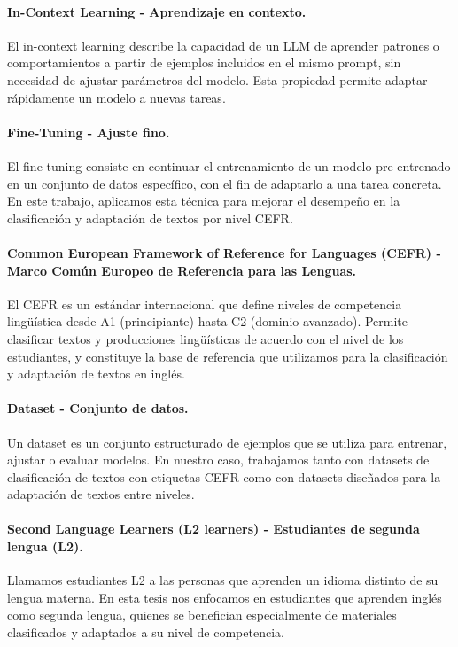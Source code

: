 \paragraph{In-Context Learning - Aprendizaje en contexto.\parencite{Brown2020}}
El in-context learning describe la capacidad de un LLM de aprender patrones o comportamientos a partir de ejemplos incluidos en el mismo prompt, sin necesidad de ajustar parámetros del modelo. Esta propiedad permite adaptar rápidamente un modelo a nuevas tareas.

\paragraph{Fine-Tuning - Ajuste fino. \parencite{finetuning_1, finetuning_2}}
El fine-tuning consiste en continuar el entrenamiento de un modelo pre-entrenado en un conjunto de datos específico, con el fin de adaptarlo a una tarea concreta. En este trabajo, aplicamos esta técnica para mejorar el desempeño en la clasificación y adaptación de textos por nivel CEFR.

\paragraph{Common European Framework of Reference for Languages (CEFR) - Marco Común Europeo de Referencia para las Lenguas.\parencite{CouncilEurope2020}}
El CEFR es un estándar internacional que define niveles de competencia lingüística desde A1 (principiante) hasta C2 (dominio avanzado). Permite clasificar textos y producciones lingüísticas de acuerdo con el nivel de los estudiantes, y constituye la base de referencia que utilizamos para la clasificación y adaptación de textos en inglés.

\paragraph{Dataset - Conjunto de datos.}
Un dataset es un conjunto estructurado de ejemplos que se utiliza para entrenar, ajustar o evaluar modelos. En nuestro caso, trabajamos tanto con datasets de clasificación de textos con etiquetas CEFR como con datasets diseñados para la adaptación de textos entre niveles.

\paragraph{Second Language Learners (L2 learners) - Estudiantes de segunda lengua (L2).}
Llamamos estudiantes L2 a las personas que aprenden un idioma distinto de su lengua materna. En esta tesis nos enfocamos en estudiantes que aprenden inglés como segunda lengua, quienes se benefician especialmente de materiales clasificados y adaptados a su nivel de competencia.

